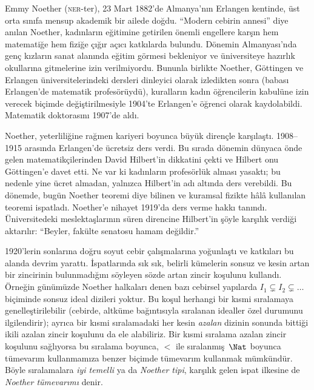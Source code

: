 \documentclass[../../../include/open-logic-section]{subfiles}
\begin{document}



Emmy Noether (\textsc{ner}-ter), 23 Mart 1882'de Almanya'nın Erlangen
kentinde, üst orta sınıfa mensup akademik bir ailede doğdu. ``Modern cebirin
annesi'' diye anılan Noether, kadınların eğitimine getirilen önemli engellere
karşın hem matematiğe hem fiziğe çığır açıcı katkılarda bulundu. Dönemin
Almanyası'nda genç kızların sanat alanında eğitim görmesi bekleniyor ve
üniversiteye hazırlık okullarına gitmelerine izin verilmiyordu. Bununla
birlikte Noether, G\"{o}ttingen ve Erlangen üniversitelerindeki dersleri
dinleyici olarak izledikten sonra (babası Erlangen'de matematik profesörüydü),
kuralların kadın öğrencilerin kabulüne izin verecek biçimde değiştirilmesiyle
1904'te Erlangen'e öğrenci olarak kaydolabildi. Matematik doktorasını 1907'de
aldı.

Noether, yeterliliğine rağmen kariyeri boyunca büyük dirençle karşılaştı.
1908--1915 arasında Erlangen'de ücretsiz ders verdi. Bu sırada dönemin
dünyaca önde gelen matematikçilerinden David Hilbert'in dikkatini çekti ve
Hilbert onu G\"{o}ttingen'e davet etti. Ne var ki kadınların profesörlük
alması yasaktı; bu nedenle yine ücret almadan, yalnızca Hilbert'in adı altında
ders verebildi. Bu dönemde, bugün Noether teoremi diye bilinen ve kuramsal
fizikte hâlâ kullanılan teoremi ispatladı. Noether'e nihayet 1919'da ders
verme hakkı tanındı. Üniversitedeki meslektaşlarının süren direncine Hilbert'in
şöyle karşılık verdiği aktarılır: ``Beyler, fakülte senatosu hamam değildir.''

1920'lerin sonlarına doğru soyut cebir çalışmalarına yoğunlaştı ve katkıları
bu alanda devrim yarattı. İspatlarında sık sık, belirli kümelerin sonsuz ve
kesin artan bir zincirinin bulunmadığını söyleyen sözde artan zincir koşulunu
kullandı. Örneğin günümüzde Noether halkaları denen bazı cebirsel yapılarda
$I_1 \subsetneq I_2 \subsetneq \dots$ biçiminde sonsuz ideal dizileri yoktur.
Bu koşul herhangi bir kısmi sıralamaya genelleştirilebilir (cebirde, altküme
bağıntısıyla sıralanan idealler özel durumunu ilgilendirir); ayrıca bir kısmi
sıralamadaki her kesin \emph{azalan} dizinin sonunda bittiği ikili azalan
zincir koşulunu da ele alabiliriz. Bir kısmi sıralama azalan zincir koşulunu
sağlıyorsa bu sıralama boyunca, $<$ ile sıralanmış~$\Nat$ boyunca tümevarım
kullanmamıza benzer biçimde tümevarım kullanmak mümkündür. Böyle
sıralamalara \emph{iyi temelli} ya da \emph{Noether tipi}, karşılık gelen
ispat ilkesine de \emph{Noether tümevarımı} denir.
\end{document}
